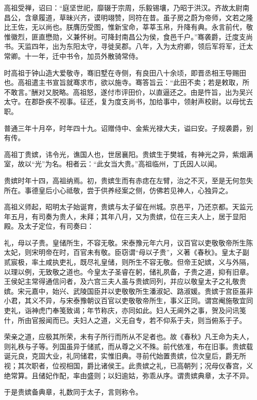 \documentclass[12pt,UTF8]{ctexbook}
\begin{document}
高祖受禅，诏曰：“庭坚世祀，靡辍于宗周，乐毅锡壤，乃昭于洪汉。齐故太尉南昌公，含章履道，草昧兴齐，谟明翊赞，同符在昔。虽子房之蔚为帝师，文若之隆比王佐，无以尚也。朕膺历受图，惟新宝命，莘莘玉帛，升降有典。永言前代，敬惟徽烈，匪直懋勋，义兼怀树。可降封南昌公为侯，食邑千户。”骞袭爵，迁度支尚书。天监四年，出为东阳太守，寻徙吴郡。八年，入为太府卿，领后军将军，迁太常卿。十一年，迁中书令，加员外散骑常侍。

时高祖于钟山造大爱敬寺，骞旧墅在寺侧，有良田八十余顷，即晋丞相王导赐田也。高祖遣主书宣旨就骞求市，欲以施寺。骞答旨云：“此田不卖；若是敕取，所不敢言。”酬对又脱略。高祖怒，遂付市评田价，以直逼还之。由是忤旨，出为吴兴太守。在郡卧疾不视事。征还，复为度支尚书，加给事中，领射声校尉。以母忧去职。

普通三年十月卒，时年四十九。诏赠侍中、金紫光禄大夫，谥曰安。子规袭爵，别有传。

高祖丁贵嫔，讳令光，谯国人也，世居襄阳。贵嫔生于樊城，有神光之异，紫烟满室，故以“光”为名。相者云：“此女当大贵。”高祖临州，丁氏因人以闻。

贵嫔时年十四，高祖纳焉。初，贵嫔生而有赤痣在左臂，治之不灭，至是无何忽失所在。事德皇后小心祗敬，尝于供养经案之侧，仿佛若见神人，心独异之。

高祖义师起，昭明太子始诞育，贵嫔与太子留在州城。京邑平，乃还京都。天监元年五月，有司奏为贵人，未拜；其年八月，又为贵嫔，位在三夫人上，居于显阳殿。及太子定位，有司奏曰：

礼，母以子贵。皇储所生，不容无敬。宋泰豫元年六月，议百官以吏敬敬帝所生陈太妃，则宋明帝在时，百官未有敬。臣窃谓“母以子贵”，义著《春秋》。皇太子副贰宸极，率土咸执吏礼，既尽礼皇储，则所生不容无敬。但帝王妃嫔，义与外隔，以理以例，无致敬之道也。今皇太子圣睿在躬，储礼夙备，子贵之道，抑有旧章。王侯妃主常得通信问者，及六宫三夫人虽与贵嫔同列，并应以敬皇太子之礼敬贵嫔。宋元嘉中，始兴、武陵国臣并以吏敬敬所生潘淑妃、路淑媛。贵嫔于宫臣虽非小君，其义不异，与宋泰豫朝议百官以吏敬敬帝所生，事义正同。谓宫阉施敬宜同吏礼，诣神虎门奉笺致谒；年节称庆，亦同如此。妇人无阃外之事，贺及问讯笺什，所由官报闻而已。夫妇人之道，义无自专，若不仰系于夫，则当俯系于子。

荣亲之道，应极其所荣，未有子所行而所从不足者也。故《春秋》凡王命为夫人，则礼秩与子等。列国虽异于储贰，而从尊之义不殊。前代依准，布在旧事。贵嫔载诞元良，克固大业，礼同储君，实惟旧典。寻前代始置贵嫔，位次皇后，爵无所视；其次职者，位视相国，爵比诸侯王。此贵嫔之礼，已高朝列；况母仪春宫，义绝常算。且储妃作配，率由盛则；以妇逾姑，弥乖从序。谓贵嫔典章，太子不异。

于是贵嫔备典章，礼数同于太子，言则称令。
\end{document}
